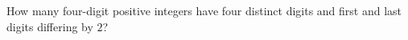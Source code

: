 How many four-digit positive integers have four distinct digits and first and last digits differing by $ 2 $?
